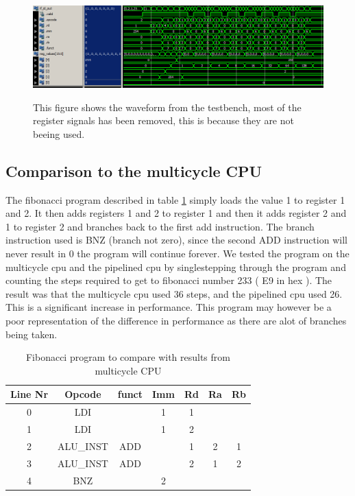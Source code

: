 \documentclass[11pt]{report}
\begin{document}
\begin{figure}
  \centering
  \includegraphics[width=.95\linewidth]{test3.png} \\
  \caption{This figure shows the waveform from the testbench, 
  most of the register signals has been removed, this is because they are not beeing used.}
  \label{fig:program3wave}
\end{figure}

\subsection*{Comparison to the multicycle CPU}

The fibonacci program described in table \ref{tab:fibonacci} simply loads the value 1
to register 1 and 2. It then adds registers 1 and 2 to register 1 and then it adds
register 2 and 1 to register 2 and branches back to the first add instruction. The 
branch instruction used is BNZ (branch not zero), since the second ADD instruction
will never result in 0 the program will continue forever. We tested the program on
the multicycle cpu and the pipelined cpu by singlestepping through the program and
counting the steps required to get to fibonacci number 233 ( E9 in hex ). The result
was that the multicycle cpu used 36 steps, and the pipelined cpu used 26. This is a
significant increase in performance. This program may however be a poor representation
of the difference in performance as there are alot of branches being taken.

\begin{table}[htbp]
  \centering
  \begin{tabular}{|c|c|c|c|c|c|c|}
    \hline
    Line Nr &	Opcode		&	funct	&	Imm	&	Rd	&	Ra	&	Rb	\\\hline
    	0	&	LDI			&			&	1	&	1	&		&		\\\hline
    	1	&	LDI			&			&	1	&	2	&		&		\\\hline
    	2	&	ALU\_INST	&	ADD		&		&	1	&	2	&	1	\\\hline
    	3	&	ALU\_INST	&	ADD		&		&	2	&	1	&	2	\\\hline
    	4	&	BNZ			&			&	2	&		&		&		\\\hline
  \end{tabular}
  \caption{Fibonacci program to compare with results from multicycle CPU}
  \label{tab:fibonacci}
\end{table}
\end{document}

